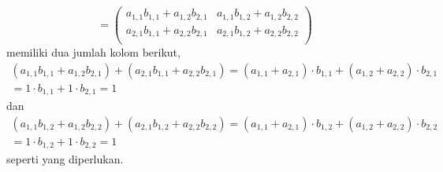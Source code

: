 \begin{exercises}
\begin{answer}
\begin{exparts}
\begin{equation*}
            =\begin{pmatrix}
              a_{1,1}b_{1,1}+a_{1,2}b_{2,1}  &a_{1,1}b_{1,2}+a_{1,2}b_{2,2} \\
              a_{2,1}b_{1,1}+a_{2,2}b_{2,1}  &a_{2,1}b_{1,2}+a_{2,2}b_{2,2} \\
            \end{pmatrix}
           \end{equation*}
             memiliki dua jumlah kolom berikut,
            \begin{multline*}
              (a_{1,1}b_{1,1}+a_{1,2}b_{2,1})
              +(a_{2,1}b_{1,1}+a_{2,2}b_{2,1})
              =(a_{1,1}+a_{2,1})\cdot b_{1,1}
                +(a_{1,2}+a_{2,2})\cdot b_{2,1}            \\
              =1\cdot b_{1,1}+1\cdot b_{2,1}
              =1
            \end{multline*}
             dan
            \begin{multline*}
              (a_{1,1}b_{1,2}+a_{1,2}b_{2,2})
              +(a_{2,1}b_{1,2}+a_{2,2}b_{2,2})
              =(a_{1,1}+a_{2,1})\cdot b_{1,2}
                +(a_{1,2}+a_{2,2})\cdot b_{2,2}              \\
              =1\cdot b_{1,2}+1\cdot b_{2,2}
              =1
            \end{multline*}
             seperti yang diperlukan.
      \end{exparts}
    \end{answer}
\end{exercises}


